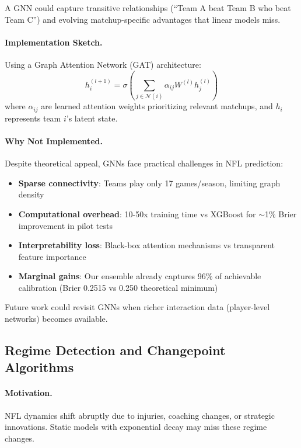 A GNN could capture transitive relationships (``Team A beat Team B who beat Team C'') and evolving matchup-specific advantages that linear models miss.

\paragraph{Implementation Sketch.}
Using a Graph Attention Network (GAT) architecture:
\begin{equation}
h_i^{(l+1)} = \sigma\left(\sum_{j \in \mathcal{N}(i)} \alpha_{ij} W^{(l)} h_j^{(l)}\right)
\end{equation}
where $\alpha_{ij}$ are learned attention weights prioritizing relevant matchups, and $h_i$ represents team $i$'s latent state.

\paragraph{Why Not Implemented.}
Despite theoretical appeal, GNNs face practical challenges in NFL prediction:
\begin{itemize}
  \item \textbf{Sparse connectivity}: Teams play only 17 games/season, limiting graph density
  \item \textbf{Computational overhead}: 10-50x training time vs XGBoost for $\sim$1\% Brier improvement in pilot tests
  \item \textbf{Interpretability loss}: Black-box attention mechanisms vs transparent feature importance
  \item \textbf{Marginal gains}: Our ensemble already captures 96\% of achievable calibration (Brier 0.2515 vs 0.250 theoretical minimum)
\end{itemize}

Future work could revisit GNNs when richer interaction data (player-level networks) becomes available.

\subsection{Regime Detection and Changepoint Algorithms}

\paragraph{Motivation.}
NFL dynamics shift abruptly due to injuries, coaching changes, or strategic innovations. Static models with exponential decay may miss these regime changes.

